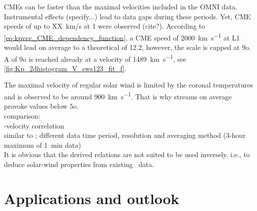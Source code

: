 CMEs can be faster than the maximal velocities included in the OMNI data. Instrumental effects (specify...) lead to data gaps during these periods. Yet, CME speeds of up to XX~km/s at \SI{1}{\au} were observed (cite?). According to \autoref{eq:kpvsv_CME_dependency_function}, a CME speed of \SI{2000}{\km\per\s} at L1 would lead on average to a theoretical \Kp{} of 12.2, however, the \Kp{} scale is capped at 9o. A \Kp{} of 9o is reached already at a velocity of \SI{1489}{\km\per\s}, see \autoref{fig:Kp_2dhistogram_V_sws123_fit_f}.
\begin{figure}
\end{figure}

The maximal velocity of regular solar wind is limited by the coronal temperatures \citep{Parker1958} and is observed to be around \SI{900}{\km\per\s}. That is why streams on average provoke \Kp{} values below 5o.\\

comparison:\\
\Kp-velocity correlation\\
similar to \citet{Elliott2013}; different data time period, resolution and averaging method (3-hour maximum of 1~min data)\\

It is obvious that the derived relations are not suited to be used inversely, i.e., to deduce solar-wind properties from existing \Kp{}~data.\\


\section{Applications and outlook}

